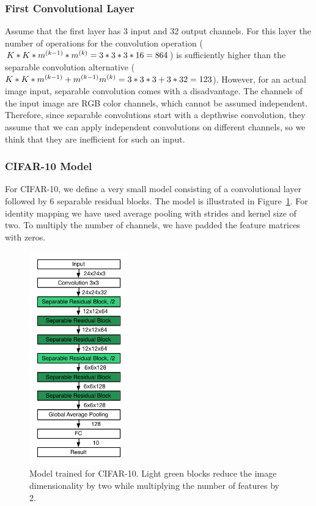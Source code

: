 \subsubsection{First Convolutional Layer}
Assume that the first layer has 3 input and 32 output channels. For this layer the number of operations for the convolution operation ($K*K*m^{(k-1)}*m^{(k)} = 3*3*3*16 = 864$) is sufficiently higher than the separable convolution alternative ($K*K*m^{(k-1)} + m^{(k-1)}m^{(k)} = 3*3*3 + 3*32=123$). However, for an actual image input, separable convolution comes with a disadvantage. The channels of the input image are RGB color channels, which cannot be assumed independent. Therefore, since separable convolutions start with a depthwise convolution, they assume that we can apply independent convolutions on different channels, so we think that they are inefficient for such an input.

\subsubsection{CIFAR-10 Model}
For CIFAR-10, we define a very small model consisting of a convolutional layer followed by 6 separable residual blocks.  The model is illustrated in Figure~\ref{fig:separable_resnet_cifar10}. For identity mapping we have used average pooling with strides and kernel size of two. To multiply the number of channels, we have padded the feature matrices with zeros.

\begin{figure}[!h]
  \begin{center}
    \includegraphics[width=0.38\textwidth]{images/separable_resnet_cifar10.pdf}
  \end{center}
  \caption{Model trained for CIFAR-10. Light green blocks reduce the image dimensionality by two while multiplying the number of features by 2.}
  \label{fig:separable_resnet_cifar10}
\end{figure}

